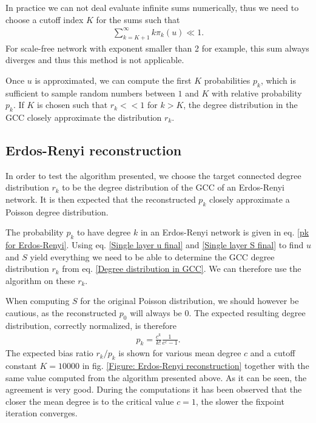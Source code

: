 \documentclass[
11pt, %
english, %
singlespacing, %
nolistspacing, %
liststotoc, %
headsepline, %
]{MastersDoctoralThesis} %
\begin{document}
In practice we can not deal evaluate infinite sums numerically, thus we need to choose a cutoff index $K$ for the sums such that
\begin{align}
	\sum_{k=K+1}^\infty k \pi_k(u) \ll 1.
\end{align}
For scale-free network with exponent smaller than 2 for example, this sum always diverges and thus this method is not applicable.

Once $u$ is approximated, we can compute the first $K$ probabilities $p_k$, which is sufficient to sample random numbers between $1$ and $K$ with relative probability $p_k$. If $K$ is chosen such that $r_k << 1$ for $k > K$, the degree distribution in the GCC closely approximate the distribution $r_k$.

\subsection{Erdos-Renyi reconstruction}

In order to test the algorithm presented, we choose the target connected degree distribution $r_k$ to be the degree distribution of the GCC of an Erdos-Renyi network. It is then expected that the reconstructed $p_k$ closely approximate a Poisson degree distribution.

The probability $p_k$ to have degree $k$ in an Erdos-Renyi network is given in eq. \eqref{pk for Erdos-Renyi}. Using eq. \eqref{Single layer u final} and \eqref{Single layer S final} to find $u$ and $S$ yield everything we need to be able to determine the GCC degree distribution $r_k$ from eq. \eqref{Degree distribution in GCC}. We can therefore use the algorithm on these $r_k$.

When computing $S$ for the original Poisson distribution, we should however be cautious, as the reconstructed $p_0$ will always be $0$. The expected resulting degree distribution, correctly normalized, is therefore
\begin{align}
	p_k = \frac{c^k}{k!} \frac{1}{e^{c} - 1}.
\end{align}
The expected bias ratio $r_k/p_k$ is shown for various mean degree $c$ and a cutoff constant $K = 10000$ in fig. \ref{Figure: Erdos-Renyi reconstruction} together with the same value computed from the algorithm presented above. As it can be seen, the agreement is very good. During the computations it has been observed that the closer the mean degree is to the critical value $c = 1$, the slower the fixpoint iteration converges.
\end{document}
